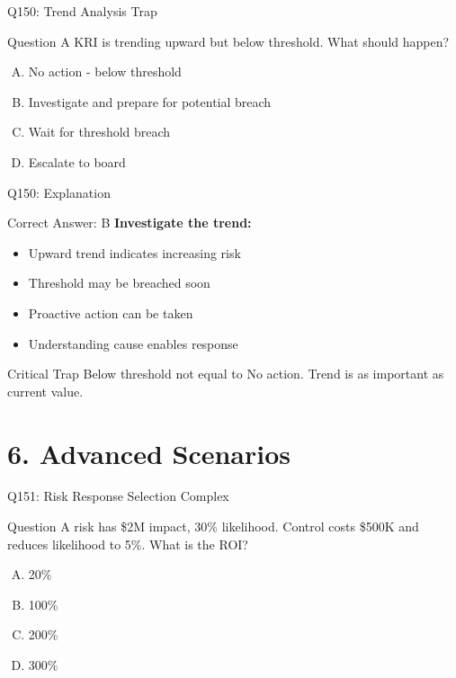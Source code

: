 \documentclass{beamer}
\begin{document}
	\begin{frame}{Q150: Trend Analysis Trap}
		\begin{block}{Question}
			A KRI is trending upward but below threshold. What should happen?
		\end{block}
		\begin{enumerate}[(A)]
			\item No action - below threshold
			\item Investigate and prepare for potential breach
			\item Wait for threshold breach
			\item Escalate to board
		\end{enumerate}
	\end{frame}
	
	\begin{frame}{Q150: Explanation}
		\begin{block}{Correct Answer: B}
			\textbf{Investigate the trend:}
			\begin{itemize}
				\item Upward trend indicates increasing risk
				\item Threshold may be breached soon
				\item Proactive action can be taken
				\item Understanding cause enables response
			\end{itemize}
		\end{block}
		\begin{alertblock}{Critical Trap}
			Below threshold not equal to No action.
			Trend is as important as current value.
		\end{alertblock}
	\end{frame}
	
	
	\section{6. Advanced Scenarios}
	
	\begin{frame}{Q151: Risk Response Selection Complex}
		\begin{block}{Question}
			A risk has \$2M impact, 30\% likelihood. Control costs \$500K and reduces likelihood to 5\%. What is the ROI?
		\end{block}
		\begin{enumerate}[(A)]
			\item 20\%
			\item 100\%
			\item 200\%
			\item 300\%
		\end{enumerate}
	\end{frame}
	
\end{document}
